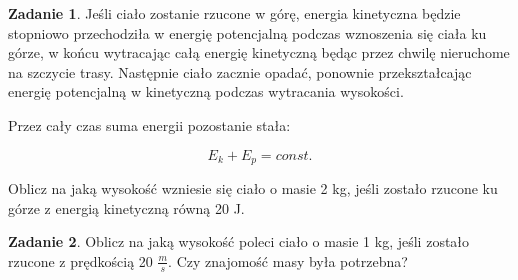 \documentclass[11pt]{article}
\theoremstyle{definition}
\newtheorem{zad}{Zadanie}
\numberwithin{zad}{section}
\begin{document}
\begin{zad}
Jeśli ciało zostanie rzucone w górę, energia kinetyczna będzie stopniowo przechodziła w energię potencjalną podczas wznoszenia się ciała ku górze, w końcu wytracając całą energię kinetyczną będąc przez chwilę nieruchome na szczycie trasy. Następnie ciało zacznie opadać, ponownie przekształcając energię potencjalną w kinetyczną podczas wytracania wysokości.

Przez cały czas suma energii pozostanie stała:

\begin{equation}
E_k + E_p = const.
\end{equation}

Oblicz na jaką wysokość wzniesie się ciało o masie 2 kg, jeśli zostało rzucone ku górze z energią kinetyczną równą 20 J.
\end{zad}

\begin{zad}
Oblicz na jaką wysokość poleci ciało o masie 1 kg, jeśli zostało rzucone z prędkością 20 $\frac ms$. Czy znajomość masy była potrzebna?
\end{zad}
\end{document}
